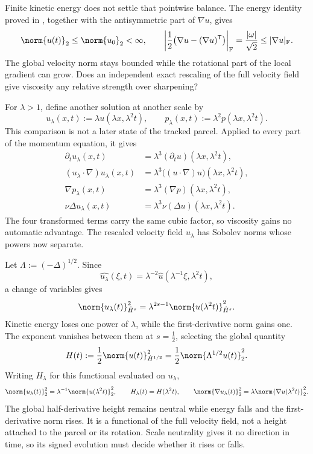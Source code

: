Finite kinetic energy does not settle that pointwise balance. The energy identity proved in , together with the antisymmetric part of \(\nabla u\), gives
\[
  \norm{u(t)}_2
  \leq
  \norm{u_0}_2
  <\infty,
  \qquad
  \left|\frac12\bigl(\nabla u-(\nabla u)^{\mathsf T}\bigr)\right|_{\mathrm F}
  =
  \frac{|\omega|}{\sqrt2}
  \leq
  |\nabla u|_{\mathrm F}.
\]
The global velocity norm stays bounded while the rotational part of the local gradient can grow. Does an independent exact rescaling of the full velocity field give viscosity any relative strength over sharpening?


For \(\lambda>1\), define another solution at another scale by
\[
  u_\lambda(x,t)
  :=
  \lambda u(\lambda x,\lambda^2t),
  \qquad
  p_\lambda(x,t)
  :=
  \lambda^2p(\lambda x,\lambda^2t).
\]
This comparison is not a later state of the tracked parcel. Applied to every part of the momentum equation, it gives
\[
\begin{aligned}
  \partial_tu_\lambda(x,t)
  &=
  \lambda^3(\partial_tu)(\lambda x,\lambda^2t),
  \\
  (u_\lambda\cdot\nabla)u_\lambda(x,t)
  &=
  \lambda^3\bigl((u\cdot\nabla)u\bigr)(\lambda x,\lambda^2t),
  \\
  \nabla p_\lambda(x,t)
  &=
  \lambda^3(\nabla p)(\lambda x,\lambda^2t),
  \\
  \nu\Delta u_\lambda(x,t)
  &=
  \lambda^3\nu(\Delta u)(\lambda x,\lambda^2t).
\end{aligned}
\]
The four transformed terms carry the same cubic factor, so viscosity gains no automatic advantage. The rescaled velocity field \(u_\lambda\) has Sobolev norms whose powers now separate.


Let \(\Lambda:=(-\Delta)^{1/2}\). Since
\[
  \widehat{u_\lambda}(\xi,t)
  =
  \lambda^{-2}\widehat u(\lambda^{-1}\xi,\lambda^2t),
\]
a change of variables gives
\[
  \norm{u_\lambda(t)}_{\dot H^s}^2
  =
  \lambda^{2s-1}
  \norm{u(\lambda^2t)}_{\dot H^s}^2.
\]
Kinetic energy loses one power of \(\lambda\), while the first-derivative norm gains one. The exponent vanishes between them at \(s=\tfrac12\), selecting the global quantity
\[
  H(t)
  :=
  \frac12\norm{u(t)}_{\dot H^{1/2}}^2
  =
  \frac12\norm{\Lambda^{1/2}u(t)}_2^2.
\]
Writing \(H_\lambda\) for this functional evaluated on \(u_\lambda\),
\[
  \norm{u_\lambda(t)}_2^2
  =
  \lambda^{-1}\norm{u(\lambda^2t)}_2^2,
  \qquad
  H_\lambda(t)=H(\lambda^2t),
  \qquad
  \norm{\nabla u_\lambda(t)}_2^2
  =
  \lambda\norm{\nabla u(\lambda^2t)}_2^2.
\]
The global half-derivative height remains neutral while energy falls and the first-derivative norm rises. It is a functional of the full velocity field, not a height attached to the parcel or its rotation. Scale neutrality gives it no direction in time, so its signed evolution must decide whether it rises or falls.

